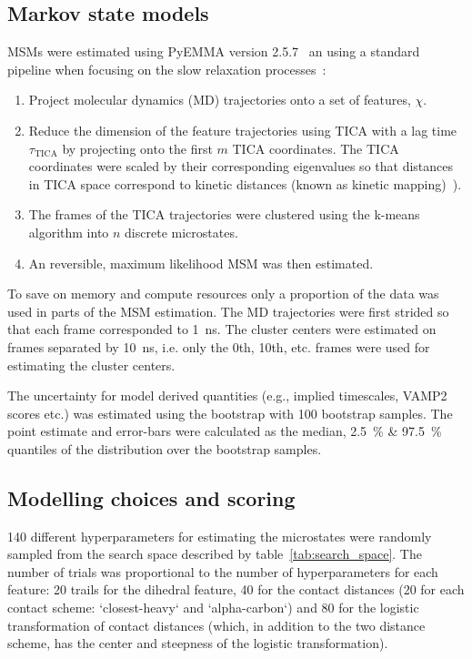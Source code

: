 \documentclass[journal=jacsat,manuscript=article]{achemso}
\begin{document}
\subsection{Markov state models}
MSMs were estimated using PyEMMA version 2.5.7~\cite{schererPyEMMASoftwarePackage2015a} an using a standard pipeline when focusing on the slow relaxation processes~\cite{noe_markov_2019, husic_markov_2018}: 
\begin{enumerate}
    \item Project molecular dynamics (MD) trajectories onto a set of features, $\chi$. 
    \item Reduce the dimension of the feature trajectories using TICA with a lag time $\tau_{\mathrm{TICA}}$ by projecting onto the first $m$ TICA coordinates. The TICA coordinates were scaled by their corresponding eigenvalues so that distances in  TICA space correspond to kinetic distances (known as kinetic mapping)~\cite{noeKineticDistanceKinetic2015}).
    \item The frames of the TICA trajectories were clustered using the k-means algorithm into $n$ discrete microstates. 
    \item An reversible, maximum likelihood MSM was then estimated. 
\end{enumerate}
To save on memory and compute resources only a proportion of the data was used in parts of the MSM estimation. The MD trajectories were first strided so that each frame corresponded to \SI{1}{\nano\second}. The cluster centers were estimated on frames separated by \SI{10}{\nano\second}, i.e. only the 0th, 10th, etc. frames were used for estimating the cluster centers. 

The uncertainty for model derived quantities (e.g., implied timescales, VAMP2 scores etc.) was estimated using the bootstrap with \num{100} bootstrap samples. The point estimate and error-bars  were calculated as the median,   \SI{2.5}{\percent} \& \SI{97.5}{\percent} quantiles of the distribution over the bootstrap samples.

\subsection{Modelling choices and scoring}
\num{140} different hyperparameters for estimating the microstates were randomly sampled from the search space described by table~\ref{tab:search_space}. The number of trials was proportional to the number of hyperparameters for each feature: 20 trails for the dihedral feature, 40 for the contact distances (20 for each contact scheme: `closest-heavy` and `alpha-carbon`) and 80 for the logistic transformation of contact distances (which, in addition to the two distance scheme, has the center and steepness of the logistic transformation).  
\end{document}
